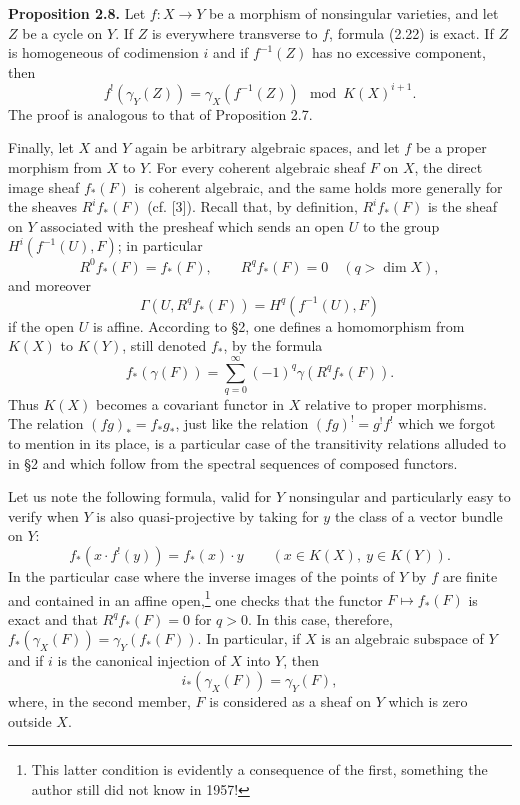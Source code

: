 \documentclass[11pt]{article}
\begin{document}
\textbf{Proposition 2.8.} Let $f:X\to Y$ be a morphism of nonsingular varieties, and let $Z$ be a cycle on $Y$. If $Z$ is everywhere transverse to $f$, formula (2.22) is exact. If $Z$ is homogeneous of codimension $i$ and if $f^{-1}(Z)$ has no excessive component, then
\begin{equation}\tag{2.23}
 f^!(\gamma_Y(Z))=\gamma_X(f^{-1}(Z))\mod K(X)^{i+1}.
\end{equation}
The proof is analogous to that of Proposition 2.7.

Finally, let $X$ and $Y$ again be arbitrary algebraic spaces, and let $f$ be a proper morphism from $X$ to $Y$. For every coherent algebraic sheaf $F$ on $X$, the direct image sheaf $f_*(F)$ is coherent algebraic, and the same holds more generally for the sheaves $R^if_*(F)$ (cf. [3]). Recall that, by definition, $R^if_*(F)$ is the sheaf on $Y$ associated with the presheaf which sends an open $U$ to the group $H^i(f^{-1}(U),F)$; in particular
\begin{equation}\tag{2.24}
 R^0f_*(F)=f_*(F),\qquad R^qf_*(F)=0\quad(q>\dim X),
\end{equation}
and moreover
\begin{equation}\tag{2.25}
 \Gamma(U,R^qf_*(F))=H^q(f^{-1}(U),F)
\end{equation}
if the open $U$ is affine. According to \S 2, one defines a homomorphism from $K(X)$ to $K(Y)$, still denoted $f_*$, by the formula
\begin{equation}\tag{2.26}
 f_*(\gamma(F))=\sum_{q=0}^{\infty}(-1)^q\gamma(R^qf_*(F)).
\end{equation}
Thus $K(X)$ becomes a covariant functor in $X$ relative to proper morphisms. The relation $(fg)_*=f_*g_*$, just like the relation $(fg)^!=g^!f^!$ which we forgot to mention in its place, is a particular case of the transitivity relations alluded to in \S 2 and which follow from the spectral sequences of composed functors.

Let us note the following formula, valid for $Y$ nonsingular and particularly easy to verify when $Y$ is also quasi-projective by taking for $y$ the class of a vector bundle on $Y$:
\begin{equation}\tag{2.27}
 f_*(x\cdot f^!(y))=f_*(x)\cdot y\qquad (x\in K(X),\ y\in K(Y)).
\end{equation}
In the particular case where the inverse images of the points of $Y$ by $f$ are finite and contained in an affine open,\footnote{This latter condition is evidently a consequence of the first, something the author still did not know in 1957!} one checks that the functor $F\mapsto f_*(F)$ is exact and that $R^qf_*(F)=0$ for $q>0$. In this case, therefore, $f_*(\gamma_X(F))=\gamma_Y(f_*(F))$. In particular, if $X$ is an algebraic subspace of $Y$ and if $i$ is the canonical injection of $X$ into $Y$, then
\begin{equation}\tag{2.28}
 i_*(\gamma_X(F))=\gamma_Y(F),
\end{equation}
where, in the second member, $F$ is considered as a sheaf on $Y$ which is zero outside $X$.
\end{document}
